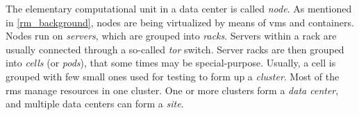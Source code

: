 
The elementary computational unit in a data center is called \textit{node}.
As mentioned in \autoref{rm_background}, nodes are being virtualized by means of \glspl{vm} and containers.
Nodes run on \textit{servers}, which are grouped into \textit{racks}.
Servers within a rack are usually connected through a so-called \textit{\gls{tor}} switch.
Server racks are then grouped into \textit{cells} (or \textit{pods}), that some times may be special-purpose.
Usually, a cell is grouped with few small ones used for testing to form up a \textit{cluster}.
Most of the \glspl{rm} manage resources in one cluster.
One or more clusters form a \textit{data center}, and multiple data centers can form a \textit{site}.